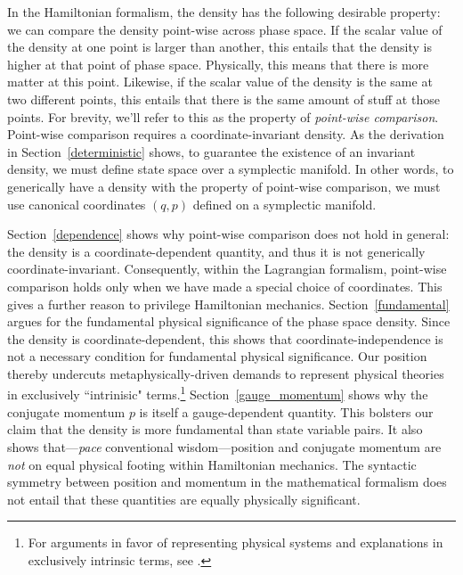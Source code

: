 \documentclass[letterpaper]{article}
\begin{document}
In the Hamiltonian formalism, the density has the following desirable property: we can compare the density point-wise across phase space. If the scalar value of the density at one point is larger than another, this entails that the density is higher at that point of phase space. Physically, this means that there is more matter at this point. Likewise, if the scalar value of the density is the same at two different points, this entails that there is the same amount of stuff at those points. For brevity, we'll refer to this as the property of \textit{point-wise comparison}. Point-wise comparison requires a coordinate-invariant density. As the derivation in Section~\ref{deterministic} shows, to guarantee the existence of an invariant density, we must define state space over a symplectic manifold. In other words, to generically have a density with the property of point-wise comparison, we must use canonical coordinates $(q, p)$ defined on a symplectic manifold. 

Section~\ref{dependence} shows why point-wise comparison does not hold in general: the density is a coordinate-dependent quantity, and thus it is not generically coordinate-invariant. Consequently, within the Lagrangian formalism, point-wise comparison holds only when we have made a special choice of coordinates. This gives a further reason to privilege Hamiltonian mechanics. Section~\ref{fundamental} argues for the fundamental physical significance of the phase space density. Since the density is coordinate-dependent, this shows that coordinate-independence is not a necessary condition for fundamental physical significance. Our position thereby undercuts metaphysically-driven demands to represent physical theories in exclusively ``intrinisic" terms.\footnote{For arguments in favor of representing physical systems and explanations in exclusively intrinsic terms, see \textcites[]{Field,North,Chen2018}.} Section~\ref{gauge_momentum} shows why the conjugate momentum $p$ is itself a gauge-dependent quantity. This bolsters our claim that the density is more fundamental than state variable pairs. It also shows that---\textit{pace} conventional wisdom---position and conjugate momentum are \textit{not} on equal physical footing within Hamiltonian mechanics. The syntactic symmetry between position and momentum in the mathematical formalism does not entail that these quantities are equally physically significant. 
\end{document}

